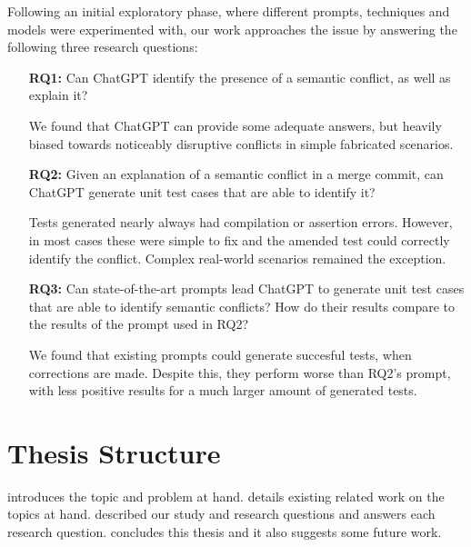Following an initial exploratory phase, where different prompts, techniques and models were experimented with, our work approaches the issue by answering
the following three research questions:

\begin{itemize}
    \item[\textbf{RQ1:}] Can ChatGPT identify the presence of a semantic conflict, as well as explain it?
    
    We found that ChatGPT can provide some adequate answers, but heavily biased towards noticeably disruptive conflicts
    in simple fabricated scenarios. \\
  
    \item[\textbf{RQ2:}] Given an explanation of a semantic conflict in a merge
    commit, can ChatGPT generate unit test cases that are able to identify it?
    
    Tests generated nearly always had compilation or assertion errors. However, in most
    cases these were simple to fix and the amended test could correctly identify the conflict.
    Complex real-world scenarios remained the exception.\\
  
    \item[\textbf{RQ3:}] Can state-of-the-art prompts lead ChatGPT to generate
    unit test cases that are able to identify semantic conflicts?  How do their
    results compare to the results of the prompt used in RQ2?
    
    We found that existing prompts could generate succesful tests, when corrections are made. Despite this,
    they perform worse than RQ2's prompt, with less positive results for a much larger amount of generated tests.\\
  \end{itemize}

\section{Thesis Structure} \label{sec:struct}


 introduces the topic and problem at hand.
 details existing related work on the topics at hand.
 described our study and research questions and  answers each research question.
 concludes this thesis and it also suggests some future work.
